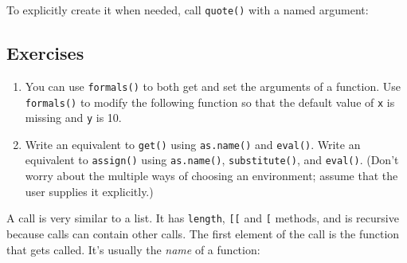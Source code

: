 To explicitly create it when needed, call \texttt{quote()} with a named
argument:\vspace*{-3pt}

\begin{Shaded}
\begin{Highlighting}[]
\NormalTok{(}\NormalTok{)}
\end{Highlighting}
\end{Shaded}\vspace*{-15pt}

\subsection{Exercises}

\begin{enumerate}
\def\labelenumi{\arabic{enumi}.}
\item
  You can use \texttt{formals()} to both get and set the arguments of a
  function. Use \texttt{formals()} to modify the following function so
  that the default value of \texttt{x} is missing and \texttt{y} is 10.

\begin{Shaded}
\begin{Highlighting}[]
\StringTok{ } 
  \StringTok{ }
\NormalTok{\}}
\end{Highlighting}
\end{Shaded}
\item
  Write an equivalent to \texttt{get()} using \texttt{as.name()} and
  \texttt{eval()}. Write an equivalent to \texttt{assign()} using
  \texttt{as.name()}, \texttt{substitute()}, and \texttt{eval()}. (Don't
  worry about the multiple ways of choosing an environment; assume that
  the user supplies it explicitly.)
\end{enumerate}


A call is very similar to a list. It has \texttt{length},
\texttt{{[}{[}} and \texttt{{[}} methods, and is recursive because calls
can contain other calls. The first element of the call is the function
that gets called. It's usually the \emph{name} of a function:

